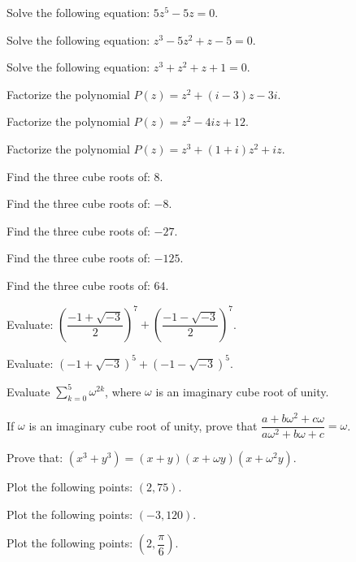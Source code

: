 \documentclass[11pt,a4paper]{article}
\begin{document}
\begin{shortlist}
\item Solve the following equation: $5z^5-5z=0$.

\item Solve the following equation: $z^3-5z^2+z-5=0$.

\item Solve the following equation: $z^3+z^2+z+1=0$.

\item Factorize the polynomial $P(z)=z^2+(i-3)z-3i$.

\item Factorize the polynomial $P(z)=z^2-4iz+12$.

\item Factorize the polynomial $P(z)=z^3+(1+i)z^2+iz$.

\item Find the three cube roots of: $8$.

\item Find the three cube roots of: $-8$.

\item Find the three cube roots of: $-27$.

\item Find the three cube roots of: $-125$.

\item Find the three cube roots of: $64$.

\item Evaluate: $\left(\dfrac{-1+\sqrt{-3}}{2}\right)^7+\left(\dfrac{-1-\sqrt{-3}}{2}\right)^7$.

\item Evaluate: $(-1+\sqrt{-3})^5+(-1-\sqrt{-3})^5$.

\item Evaluate $\displaystyle\sum_{k=0}^{5}\omega^{2k}$, where $\omega$ is an imaginary cube root of unity.

\item If $\omega$ is an imaginary cube root of unity, prove that $\dfrac{a+b\omega^2+c\omega}{a\omega^2+b\omega+c}=\omega$.

\item Prove that: $(x^3+y^3)=(x+y)(x+\omega y)(x+\omega^2 y)$.

\item Plot the following points: $(2,75)$.

\item Plot the following points: $(-3,120)$.

\item Plot the following points: $\left(2,\dfrac{\pi}{6}\right)$.


\end{shortlist}
\end{document}
